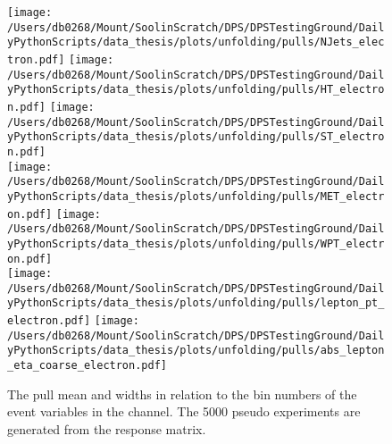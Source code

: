 \begin{figure*}[hp]
	\centering
	\texttt{[image: /Users/db0268/Mount/SoolinScratch/DPS/DPSTestingGround/DailyPythonScripts/data\_thesis/plots/unfolding/pulls/NJets\_electron.pdf]} 
	\texttt{[image: /Users/db0268/Mount/SoolinScratch/DPS/DPSTestingGround/DailyPythonScripts/data\_thesis/plots/unfolding/pulls/HT\_electron.pdf]} 
	\texttt{[image: /Users/db0268/Mount/SoolinScratch/DPS/DPSTestingGround/DailyPythonScripts/data\_thesis/plots/unfolding/pulls/ST\_electron.pdf]} \\
	\texttt{[image: /Users/db0268/Mount/SoolinScratch/DPS/DPSTestingGround/DailyPythonScripts/data\_thesis/plots/unfolding/pulls/MET\_electron.pdf]} 
	\texttt{[image: /Users/db0268/Mount/SoolinScratch/DPS/DPSTestingGround/DailyPythonScripts/data\_thesis/plots/unfolding/pulls/WPT\_electron.pdf]} \\
	\texttt{[image: /Users/db0268/Mount/SoolinScratch/DPS/DPSTestingGround/DailyPythonScripts/data\_thesis/plots/unfolding/pulls/lepton\_pt\_electron.pdf]} 
	\texttt{[image: /Users/db0268/Mount/SoolinScratch/DPS/DPSTestingGround/DailyPythonScripts/data\_thesis/plots/unfolding/pulls/abs\_lepton\_eta\_coarse\_electron.pdf]} 
	\caption[The pull mean and widths in relation to the bin numbers of the event variables in the \eJets{} channel. The 5000 pseudo experiments are generated from the \powhegpythia{} response matrix.]{The pull mean and widths in relation to the bin numbers of the event variables in the \eJets{} channel. The 5000 pseudo experiments are generated from the \powhegpythia{} response matrix.}
	\label{fig:Pullse}
\end{figure*}

